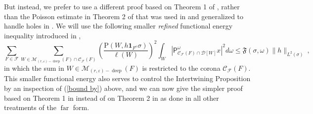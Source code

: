 \documentclass{amsart}%
\theoremstyle{plain}
\numberwithin{equation}{section}
\begin{document}
But instead, we prefer to use a different proof based on Theorem 1 of
\cite{Saw3}, rather than the Poisson estimate in Theorem 2 of \cite{Saw3} that
was used in \cite{LaSaShUr3} and generalized to handle holes in \cite{Hyt2}.
We will use the following smaller \emph{refined} functional energy inequality
introduced in \cite{SaWi},%
\[
\sum_{F\in\mathcal{F}}\sum_{W\in\mathcal{M}_{\left(  r,\varepsilon\right)
-\operatorname*{deep}}\left(  F\right)  \cap\mathcal{C}_{\mathcal{F}}\left(
F\right)  }\left(  \frac{\mathrm{P}\left(  W,h\mathbf{1}_{F^{c}}\sigma\right)
}{\ell\left(  W\right)  }\right)  ^{2}\int_{W}\left\vert \mathsf{P}%
_{\mathcal{C}_{\mathcal{F}}\left(  F\right)  \cap\mathcal{D}\left[  W\right]
}^{\omega}x\right\vert ^{2}d\omega\leq\mathfrak{F}\left(  \sigma
,\omega\right)  \lVert h\rVert_{L^{2}\left(  \sigma\right)  }\ ,
\]
in which the sum in $W\in\mathcal{M}_{\left(  r,\varepsilon\right)
-\operatorname*{deep}}\left(  F\right)  $ is restricted to the corona
$\mathcal{C}_{\mathcal{F}}\left(  F\right)  $. This smaller functional energy
also serves to control the Intertwining Proposition by an inspection of
(\ref{bound by}) above, and we can now give the simpler proof based on Theorem
1 in \cite{Saw3} instead of on Theorem 2 in \cite{Saw3} as done in all other
treatments of the $\operatorname*{far}$ form.
\end{document}
